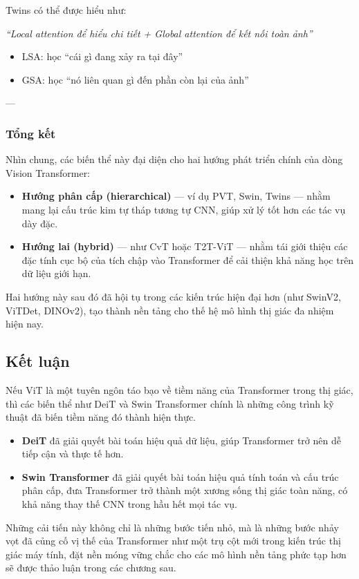 Twins có thể được hiểu như:

\begin{center}
	\textit{“Local attention để hiểu chi tiết + Global attention để kết nối toàn ảnh”}
\end{center}

\begin{itemize}
	\item LSA: học “cái gì đang xảy ra tại đây”
	\item GSA: học “nó liên quan gì đến phần còn lại của ảnh”
\end{itemize}
---

\subsubsection{Tổng kết}
Nhìn chung, các biến thể này đại diện cho hai hướng phát triển chính của dòng Vision Transformer:
\begin{itemize}
	\item \textbf{Hướng phân cấp (hierarchical)} — ví dụ PVT, Swin, Twins — nhằm mang lại cấu trúc kim tự tháp tương tự CNN, giúp xử lý tốt hơn các tác vụ dày đặc.
	\item \textbf{Hướng lai (hybrid)} — như CvT hoặc T2T-ViT — nhằm tái giới thiệu các đặc tính cục bộ của tích chập vào Transformer để cải thiện khả năng học trên dữ liệu giới hạn.
\end{itemize}
Hai hướng này sau đó đã hội tụ trong các kiến trúc hiện đại hơn (như SwinV2, ViTDet, DINOv2), tạo thành nền tảng cho thế hệ mô hình thị giác đa nhiệm hiện nay.

\subsection{Kết luận}
Nếu ViT là một tuyên ngôn táo bạo về tiềm năng của Transformer trong thị giác, thì các biến thể như DeiT và Swin Transformer chính là những công trình kỹ thuật đã biến tiềm năng đó thành hiện thực.
\begin{itemize}
	\item \textbf{DeiT} đã giải quyết bài toán hiệu quả dữ liệu, giúp Transformer trở nên dễ tiếp cận và thực tế hơn.
	\item \textbf{Swin Transformer} đã giải quyết bài toán hiệu quả tính toán và cấu trúc phân cấp, đưa Transformer trở thành một xương sống thị giác toàn năng, có khả năng thay thế CNN trong hầu hết mọi tác vụ.
\end{itemize}
Những cải tiến này không chỉ là những bước tiến nhỏ, mà là những bước nhảy vọt đã củng cố vị thế của Transformer như một trụ cột mới trong kiến trúc thị giác máy tính, đặt nền móng vững chắc cho các mô hình nền tảng phức tạp hơn sẽ được thảo luận trong các chương sau.

